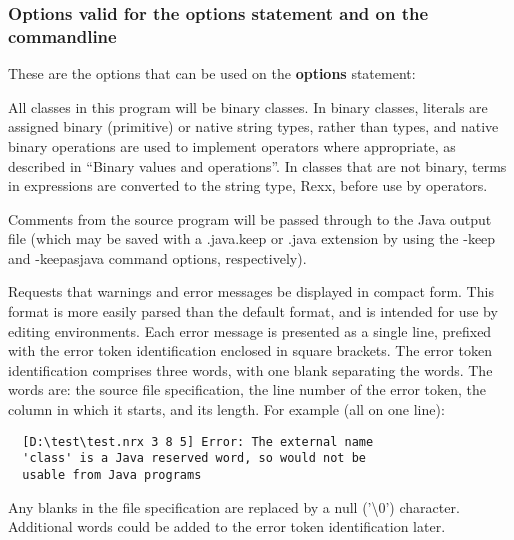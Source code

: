 \subsubsection{Options valid for the options statement and on the commandline}
These are the options that can be used on the \textbf{options} statement:
\begin{description}
\item[binary]
All classes in this program will be binary classes. In binary classes, literals are assigned binary (primitive) or native string types, rather than \nr{} types, and native binary operations are used to implement operators where appropriate, as described in “Binary values and operations”. In classes that are not binary, terms in expressions are converted to the \nr{} string type, Rexx, before use by operators.

\item[comments]
Comments from the \nr{} source program will be passed through to the Java output file (which may be saved with a .java.keep or .java extension by using the -keep and -keepasjava command options, respectively).

\item[compact]
Requests that warnings and error messages be displayed in compact form. This format is more easily parsed than the default format, and is intended for use by editing environments.
Each error message is presented as a single line, prefixed with the error token identification enclosed in square brackets. The error token identification comprises three words, with one blank separating the words. The words are: the source file specification, the line number of the error token, the column in which it starts, and its length. For example (all on one line):
\begin{verbatim}
  [D:\test\test.nrx 3 8 5] Error: The external name
  'class' is a Java reserved word, so would not be
  usable from Java programs
\end{verbatim}
Any blanks in the file specification are replaced by a null ('\textbackslash 0') character. Additional words could be added to the error token identification later.


\end{description}
